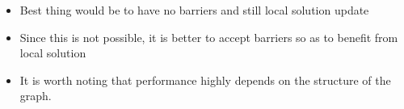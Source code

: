 \documentclass[letterpaper]{article}
\begin{document}
\begin{invisible}
 \begin{itemize}
   \item Best thing would be to have no barriers and still local solution update
   \item Since this is not possible, it is better to accept barriers so as to benefit from local solution
   \item It is worth noting that performance highly depends on the structure of the graph.
 \end{itemize}
\end{invisible}



\end{document}
